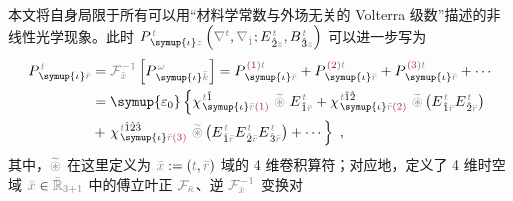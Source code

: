 本文将自身局限于所有可以用“材料学常数与外场无关的 Volterra 级数\cite{pintoExactVolterraseriesComputation1982,shenNonlinearOpticalSusceptibilities2001}”描述的非线性光学现象。此时 $P^{\;\!\mathcolor{gray}{t}}_{\;\! \symup{\iota}\mathcolor{gray}{z}} \left( \mathcolor{gray}{\nabla^t}, \mathcolor{gray}{\nabla_{\hat{1}}} ; E^{\;\!\mathcolor{gray}{t}}_{\;\! \hat{2}\mathcolor{gray}{z}}, B^{\;\!\mathcolor{gray}{t}}_{\;\! \hat{3}\mathcolor{gray}{z}} \right)$ 可以进一步写为\cite{teixeiraOpticalTransmissionModeling2013,andreasczylwikNonlinearSystemModeling1986,shenNonlinearOpticalSusceptibilities2001,zalevskyOpticalImplementationSecondorder2001,zhangNonlinearQuantumInputoutput2014}
\begin{subequations}
\begin{align}
	P^{\;\!\mathcolor{gray}{t}}_{\;\! \symup{\iota}\mathcolor{gray}{\bar{r}}} &= \mathcolor{gray}{\mathcal F_{\bar{x}}^{-1}} \left[ P^{\;\! \mathcolor{gray}{\omega}}_{\;\! \symup{\iota}\mathcolor{gray}{\bar{k}}} \right] = P^{\;\! \textcolor{Maroon}{(1)} \mathcolor{gray}{t}}_{\;\! \symup{\iota}\mathcolor{gray}{\bar{r}}} + P^{\;\! \textcolor{Maroon}{(2)} \mathcolor{gray}{t}}_{\;\! \symup{\iota}\mathcolor{gray}{\bar{r}}} + P^{\;\! \textcolor{Maroon}{(3)} \mathcolor{gray}{t}}_{\;\! \symup{\iota}\mathcolor{gray}{\bar{r}}} + \cdots \label{P_barx} \\ &= {\symup{\varepsilon_0}} \left\{ \chi^{\;\! \mathcolor{gray}{t} \hat{1}}_{\;\! \symup{\iota} \mathcolor{gray}{\bar{r}} \textcolor{Maroon}{(1)}} ~\mathcolor{gray}{\widetilde \circledast}~ E^{\;\!\mathcolor{gray}{t}}_{\;\! \hat{1} \mathcolor{gray}{\bar{r}}} + \chi^{\;\! \mathcolor{gray}{t} \hat{1} \hat{2}}_{\;\! \symup{\iota} \mathcolor{gray}{\bar{r}} \textcolor{Maroon}{(2)}}~\mathcolor{gray}{\widetilde \circledast}\left( E^{\;\!\mathcolor{gray}{t}}_{\;\! \hat{1} \mathcolor{gray}{\bar{r}}} E^{\;\!\mathcolor{gray}{t}}_{\;\! \hat{2} \mathcolor{gray}{\bar{r}}} \right) \right. \\ &+ \left. \chi^{\;\! \mathcolor{gray}{t} \hat{1} \hat{2} \hat{3}}_{\;\! \symup{\iota} \mathcolor{gray}{\bar{r}} \textcolor{Maroon}{(3)}}~\mathcolor{gray}{\widetilde \circledast}\left( E^{\;\!\mathcolor{gray}{t}}_{\;\! \hat{1} \mathcolor{gray}{\bar{r}}} E^{\;\!\mathcolor{gray}{t}}_{\;\! \hat{2} \mathcolor{gray}{\bar{r}}} E^{\;\!\mathcolor{gray}{t}}_{\;\! \hat{3} \mathcolor{gray}{\bar{r}}} \right) + \cdots \right\}~,
\end{align}
\end{subequations}
其中，$\mathcolor{gray}{\widetilde \circledast}$ 在这里定义为 $\mathcolor{gray}{\bar{x}} := \left( \mathcolor{gray}{t}, \mathcolor{gray}{\bar{r}} \right)$ 域的 4 维卷积算符；对应地，定义了 4 维时空域 $\mathcolor{gray}{\bar{x}} \in \mathcolor{gray}{\bar{\mathbb{R}}_{3+1}}$ 中的傅立叶正 $\mathcolor{gray}{\mathcal F_{\bar{\kappa}}}$、逆 $\mathcolor{gray}{\mathcal F_{\bar{x}}^{-1}}$ 变换对
